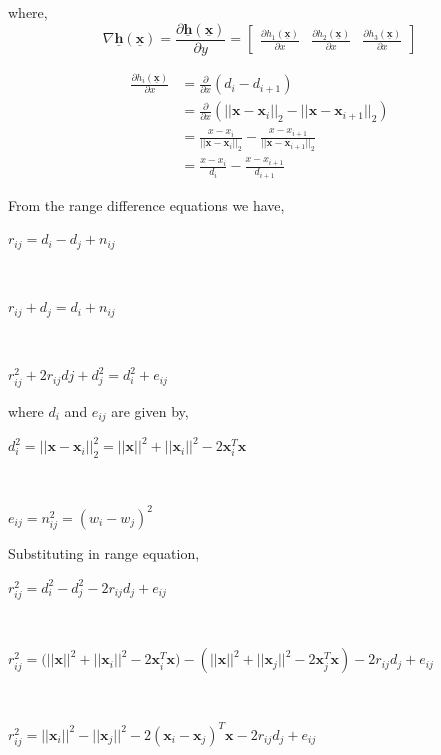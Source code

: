 \documentclass[a4 paper]{article}
\begin{document}
where,
\[
\nabla \mathbf{\underline{h}(\mathbf{\underline{x}})} =
\frac{\partial \mathbf{\underline{h}(\mathbf{\underline{x}})}}{\partial y} 
= 
\begin{bmatrix}
\frac{\partial h_{1}(\mathbf{\underline{x}})}{\partial x} & \frac{\partial h_{2}(\mathbf{\underline{x}})}{\partial x} & \frac{\partial h_{3}(\mathbf{\underline{x}})}{\partial x}
\end{bmatrix}
\]

\begin{align*}
\frac{\partial h_{i}(\mathbf{\underline{x}})}{\partial x} &= \frac{\partial}{\partial x} (d_{i} - d_{i+1})
\\ &= \frac{\partial}{\partial x}(||\mathbf{x}-\mathbf{x}_{i}||_{2} - ||\mathbf{x}-\mathbf{x}_{i+1}||_{2} )
\\ &= \frac{x- x_{i}}{||\mathbf{x}-\mathbf{x}_{i}||_{2}} - \frac{x- x_{i+1}}{||\mathbf{x}-\mathbf{x}_{i+1}||_{2}}
\\ &= \frac{x- x_{i}}{d_{i}} - \frac{x- x_{i+1}}{d_{i+1}}
\end{align*}






\newpage
{}

\solution From the range difference equations we have,
\\ \centerline{$ r_{ij} = d_{i} - d_{j} + n_{ij} $}
\\ \centerline{$ r_{ij} + d_{j} = d_{i} + n_{ij} $}
\\ \centerline{$ r_{ij}^{2} + 2r_{ij}d{j}+ d_{j}^2 = d_{i}^2 + e_{ij} $}

where $ d_{i} $ and $ e_{ij} $ are given by,
\\ \centerline{$ d_{i}^2 = ||\mathbf{x}-\mathbf{x}_{i}||_{2}^{2} = ||\mathbf{x}||^{2} + ||\mathbf{x}_{i}||^{2} - 2\mathbf{x}_{i}^{T}\mathbf{x} $}
\\ \centerline{$ e_{ij} = n_{ij}^2 = (w_{i} - w_{j})^2 $}

Substituting in range equation,
\\ \centerline{$ r_{ij}^{2} = d_{i}^{2} - d_{j}^{2} - 2r_{ij}d_{j} + e_{ij} $}
\\ \centerline{$ r_{ij}^2 = (||\mathbf{x}||^{2} + ||\mathbf{x}_{i}||^{2} - 2\mathbf{x}_{i}^{T}\mathbf{x)} - (||\mathbf{x}||^{2} + ||\mathbf{x}_{j}||^{2} - 2\mathbf{x}_{j}^{T}\mathbf{x})  - 2r_{ij}d_{j} + e_{ij} $}
\\ \centerline{$ r_{ij}^{2} = ||\mathbf{x}_{i}||^{2} - ||\mathbf{x}_{j}||^{2} - 2(\mathbf{x}_{i} - \mathbf{x}_{j})^{T}\mathbf{x} -2r_{ij}d_{j} + e_{ij} $}
\end{document}
